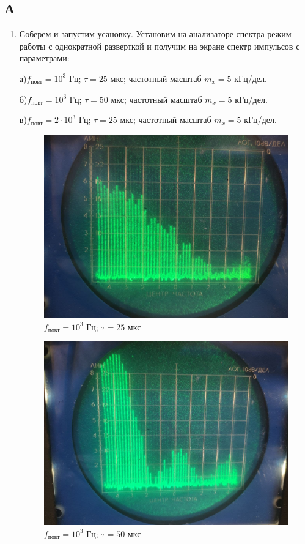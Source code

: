 \documentclass[a4paper, 12pt]{article}%
\begin{document}
\subsection*{А}

\begin{enumerate}

\item Соберем и запустим усановку. Установим на анализаторе спектра режим работы с однократной разверткой и получим на экране спектр импульсов с параметрами:

а)$f_{\text{повт}} = 10^3$ Гц; $\tau = 25$ мкс; частотный масштаб $m_x = 5$ кГц/дел.

б)$f_{\text{повт}} = 10^3$ Гц; $\tau = 50$ мкс; частотный масштаб $m_x = 5$ кГц/дел.

в)$f_{\text{повт}} = 2\cdot 10^3$ Гц; $\tau = 25$ мкс; частотный масштаб $m_x = 5$ кГц/дел.

\begin{figure}[h!]
\centering
\includegraphics[scale=0.2]{images/25_1000-a.jpg}
\caption{$f_{\text{повт}} = 10^3$ Гц; $\tau = 25$ мкс}
\label{fig:Image1}
\end{figure}

\begin{figure}[h!]
\centering
\includegraphics[scale=0.2]{images/50_1000-a.jpg}
\caption{$f_{\text{повт}} = 10^3$ Гц; $\tau = 50$ мкс}
\label{fig:Image1}
\end{figure}


\end{enumerate}
\end{document}
